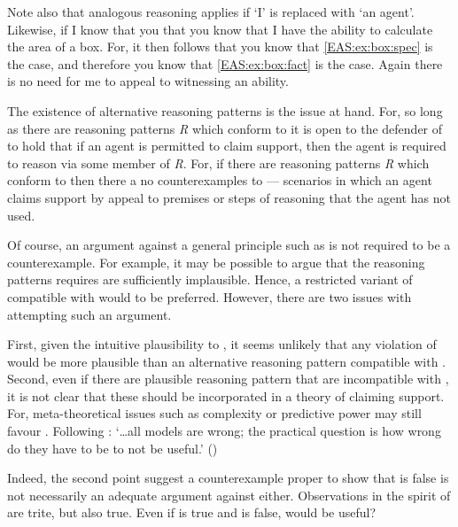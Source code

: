\begin{note}[Alternatives]
  Note also that analogous reasoning applies if `I' is replaced with `an agent'.
  Likewise, if I know that you that you know that I have the ability to calculate the area of a box.
  For, it then follows that you know that \ref{EAS:ex:box:spec} is the case, and therefore you know that \ref{EAS:ex:box:fact} is the case.
  Again there is no need for me to appeal to witnessing an ability.
\end{note}

\begin{note}[Box]
  The existence of alternative reasoning patterns is the issue at hand.
  For, so long as there are reasoning patterns \emph{R} which conform to \ESU{} it is open to the defender of \ESU{} to hold that if an agent is permitted to claim support, then the agent is required to reason via some member of \emph{R}.
  For, if there are reasoning patterns \emph{R} which conform to \ESU{} then there a no counterexamples to \ESU{} --- scenarios in which an agent claims support by appeal to premises or steps of reasoning that the agent has not used.

  Of course, an argument against a general principle such as \ESU{} is not required to be a counterexample.
  For example, it may be possible to argue that the reasoning patterns \ESU{} requires are sufficiently implausible.
  Hence, a restricted variant of \ESU{} compatible with \EAS{} would to be preferred.
  However, there are two issues with attempting such an argument.

  First, given the intuitive plausibility to \ESU{}, it seems unlikely that any violation of \ESU{} would be more plausible than an alternative reasoning pattern compatible with \ESU{}.
  Second, even if there are plausible reasoning pattern that are incompatible with \ESU{}, it is not clear that these should be incorporated in a theory of claiming support.
  For, meta-theoretical issues such as complexity or predictive power may still favour \ESU{}.
  Following \citeauthor{Box:1987vn}: `\dots all models are wrong; the practical question is how wrong do they have to be to not be useful.' (\citeyear[74]{Box:1987vn})

  Indeed, the second point suggest a counterexample proper to show that \ESU{} is false is not necessarily an adequate argument against \ESU{} either.
  Observations in the spirit of \citeauthor{Box:1987vn} are trite, but also true.
  Even if \EAS{} is true and \ESU{} is false, would \EAS{} be useful?
\end{note}

